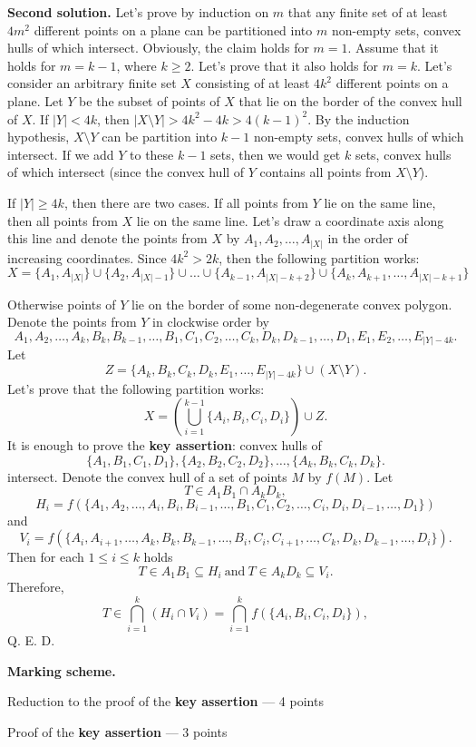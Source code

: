 \documentclass[12pt]{article}
\def\solII{\par \noindent \textbf{Second solution. }}
\begin{document}
\bigskip

\solII Let's prove by induction on $m$ that any finite set of at least $4m^2$ different points on a plane can be partitioned into $m$ non-empty sets, convex hulls of which intersect. Obviously, the claim holds for $m = 1$. Assume that it holds for $m = k - 1$, where $k \geq 2$. Let's prove that it also holds for $m = k$. Let's consider an arbitrary finite set $X$ consisting of at least $4k^2$ different points on a plane. Let $Y$ be the subset of points of $X$ that lie on the border of the convex hull of $X$. If $|Y| < 4k$, then $|X \setminus Y| > 4k^2 - 4k > 4(k-1)^2$. By the induction hypothesis, $X \setminus Y$ can be partition into $k - 1$ non-empty sets, convex hulls of which intersect. If we add $Y$ to these $k - 1$ sets, then we would get $k$ sets, convex hulls of which intersect (since the convex hull of $Y$ contains all points from $X \setminus Y$).

If $|Y| \geq 4k$, then there are two cases. If all points from $Y$ lie on the same line, then all points from $X$ lie on the same line. Let's draw a coordinate axis along this line and denote the points from $X$ by $A_1, A_2, \ldots, A_{|X|}$ in the order of increasing coordinates. Since $4k^2 > 2k$, then the following partition works:
\[X = \{A_1, A_{|X|}\} \cup \{A_2, A_{|X|-1}\} \cup \ldots \cup \{A_{k-1}, A_{|X|-k+2}\} \cup \{A_k, A_{k+1}, \ldots, A_{|X|-k+1}\}\]

Otherwise points of $Y$ lie on the border of some non-degenerate convex polygon. Denote the points from $Y$ in clockwise order by 
\[A_1, A_2, \ldots, A_k, B_k, B_{k-1}, \ldots, B_1, C_1, C_2, \ldots, C_k, D_k, D_{k-1}, \ldots, D_1, E_1, E_2, \ldots, E_{|Y| - 4k}.\]
Let 
\[Z = \{A_k, B_k, C_k, D_k, E_1, \ldots, E_{|Y| - 4k}\} \cup (X \setminus Y).\]
Let's prove that the following partition works:
\[X = \left(\bigcup_{i=1}^{k-1} \{A_i, B_i, C_i, D_i\}\right) \cup Z.\]
It is enough to prove the \textbf{key assertion}: convex hulls of 
\[\{A_1, B_1, C_1, D_1\}, \{A_2, B_2, C_2, D_2\}, \ldots, \{A_k, B_k, C_k, D_k\}.\]
intersect. Denote the convex hull of a set of points $M$ by $f(M)$. Let
\[T \in A_1B_1 \cap A_kD_k,\]
\[H_i = f(\{A_1, A_2, \ldots, A_i, B_i, B_{i-1}, \ldots, B_1, C_1, C_2, \ldots, C_i, D_i, D_{i-1}, \ldots, D_1\})\]
and
\[V_i = f(\{A_i, A_{i+1}, \ldots, A_k, B_k, B_{k-1}, \ldots, B_i, C_i, C_{i+1}, \ldots, C_k, D_k, D_{k-1}, \ldots, D_i\}).\]
Then for each $1 \leq i \leq k$ holds
\[T \in A_1B_1 \subseteq H_i \ \text{and} \ T \in A_kD_k \subseteq V_i.\]
Therefore,
\[T \in \bigcap_{i=1}^{k} (H_i \cap V_i) = \bigcap_{i=1}^{k} f(\{A_i, B_i, C_i, D_i\}),\]
Q. E. D.

\bigskip

\textbf{Marking scheme.}
\begin{compactitem}
\item Reduction to the proof of the \textbf{key assertion} --- 4 points
\item Proof of the \textbf{key assertion} --- 3 points
\end{compactitem}

\bigskip
\end{document}
